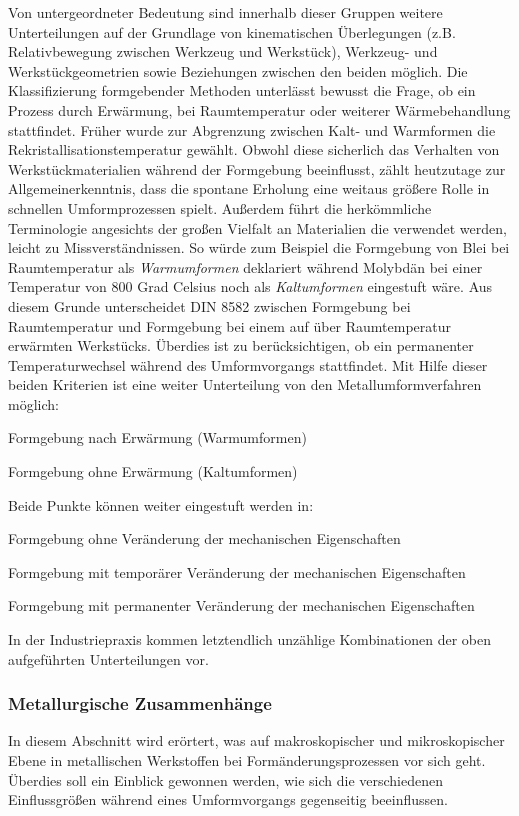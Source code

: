 \documentclass[12pt,a4paper,parskip,twoside,BCOR5mm,headsepline]{scrartcl}
\begin{document}
\begin{description*}
\begin{itemize*}
Von untergeordneter Bedeutung sind innerhalb dieser Gruppen  weitere Unterteilungen auf der Grundlage von kinematischen Überlegungen (z.B. Relativbewegung zwischen Werkzeug und Werkstück), Werkzeug- und Werkstückgeometrien sowie Beziehungen zwischen den beiden möglich. Die Klassifizierung formgebender Methoden unterlässt bewusst die Frage, ob ein Prozess durch Erwärmung, bei Raumtemperatur oder weiterer Wärmebehandlung stattfindet. Früher  wurde zur Abgrenzung zwischen Kalt- und Warmformen die Rekristallisationstemperatur gewählt. Obwohl diese sicherlich das Verhalten  von Werkstückmaterialien während der Formgebung beeinflusst, zählt heutzutage zur Allgemeinerkenntnis,  dass die spontane Erholung  eine weitaus größere Rolle in schnellen Umformprozessen spielt. Außerdem führt die herkömmliche Terminologie angesichts der großen Vielfalt  an Materialien die verwendet werden, leicht zu Missverständnissen. So würde zum Beispiel die Formgebung von Blei bei Raumtemperatur als \emph{Warmumformen} deklariert während Molybdän bei einer Temperatur von 800 Grad Celsius noch als \emph{Kaltumformen} eingestuft wäre. Aus diesem Grunde unterscheidet DIN 8582 zwischen Formgebung bei Raumtemperatur und Formgebung bei einem auf über Raumtemperatur erwärmten Werkstücks. Überdies ist zu berücksichtigen, ob ein permanenter Temperaturwechsel während des Umformvorgangs stattfindet. Mit Hilfe dieser beiden Kriterien ist eine weiter Unterteilung von den Metallumformverfahren möglich:

\begin{enumerate*}
\item Formgebung nach Erwärmung (Warmumformen)
\item Formgebung ohne Erwärmung (Kaltumformen)
\end{enumerate*}

Beide Punkte können weiter eingestuft werden in:

\begin{itemize*}
\item Formgebung ohne Veränderung der mechanischen Eigenschaften
\item Formgebung mit temporärer Veränderung der mechanischen Eigenschaften
\item Formgebung mit permanenter Veränderung der mechanischen Eigenschaften
\end{itemize*}

In der Industriepraxis kommen letztendlich unzählige Kombinationen der oben aufgeführten Unterteilungen vor. \autocite[2.1ff]{kl}
\subsubsection{Metallurgische Zusammenhänge}
In diesem Abschnitt wird erörtert, was auf makroskopischer und mikroskopischer Ebene in metallischen Werkstoffen bei Formänderungsprozessen vor sich geht. Überdies soll ein Einblick gewonnen werden, wie sich die verschiedenen Einflussgrößen während eines Umformvorgangs gegenseitig beeinflussen.



\end{itemize*}
\end{description*}
\end{document}
